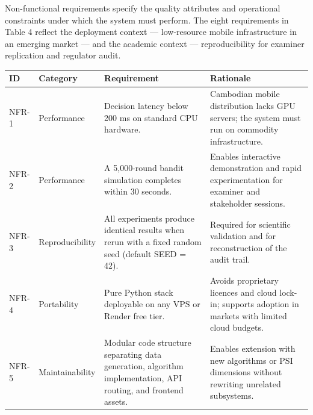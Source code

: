 Non-functional requirements specify the quality attributes and operational constraints under which the system must perform. The eight requirements in Table 4 reflect the deployment context --- low-resource mobile infrastructure in an emerging market --- and the academic context --- reproducibility for examiner replication and regulator audit.

\label{tab:4.2}

{\def\LTcaptype{none} %
\begin{longtable}[]{@{}
  >{\raggedright\arraybackslash}p{}
  >{\raggedright\arraybackslash}p{}
  >{\raggedright\arraybackslash}p{}
  >{\raggedright\arraybackslash}p{}@{}}
\toprule\noalign{}
\begin{minipage}[b]{\linewidth}\raggedright
ID
\end{minipage} & \begin{minipage}[b]{\linewidth}\raggedright
Category
\end{minipage} & \begin{minipage}[b]{\linewidth}\raggedright
Requirement
\end{minipage} & \begin{minipage}[b]{\linewidth}\raggedright
Rationale
\end{minipage} \\
\midrule\noalign{}
\endhead
\bottomrule\noalign{}
\endlastfoot
NFR-1 & Performance & Decision latency below 200 ms on standard CPU hardware. & Cambodian mobile distribution lacks GPU servers; the system must run on commodity infrastructure. \\
NFR-2 & Performance & A 5,000-round bandit simulation completes within 30 seconds. & Enables interactive demonstration and rapid experimentation for examiner and stakeholder sessions. \\
NFR-3 & Reproducibility & All experiments produce identical results when rerun with a fixed random seed (default SEED = 42). & Required for scientific validation and for reconstruction of the audit trail. \\
NFR-4 & Portability & Pure Python stack deployable on any VPS or Render free tier. & Avoids proprietary licences and cloud lock-in; supports adoption in markets with limited cloud budgets. \\
NFR-5 & Maintainability & Modular code structure separating data generation, algorithm implementation, API routing, and frontend assets. & Enables extension with new algorithms or PSI dimensions without rewriting unrelated subsystems. \\

\end{longtable}}
